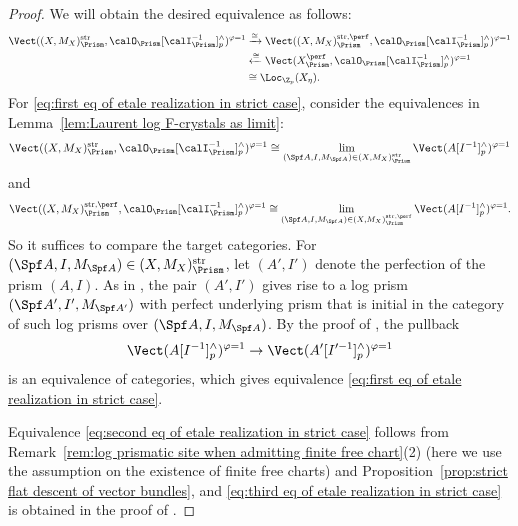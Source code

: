 \begin{proof}
We will obtain the desired equivalence as follows:
\begin{align}
\Vect((X,M_X)_\Prism^\mathrm{str},\calO_\Prism[\calI_\Prism^{-1}]^\wedge_p)^{\varphi=1}
&\xrightarrow{\cong} \Vect((X,M_X)_\Prism^{\mathrm{str},\perf},\calO_\Prism[\calI_\Prism^{-1}]^\wedge_p)^{\varphi=1}
\label{eq:first eq of etale realization in strict case}\\
&\xleftarrow{\cong} \Vect(X_\Prism^\perf,\calO_\Prism[\calI_\Prism^{-1}]^\wedge_p)^{\varphi=1}
\label{eq:second eq of etale realization in strict case}
\\
&\cong \Loc_{\Z_p}(X_\eta).
\label{eq:third eq of etale realization in strict case}
\end{align}
For \eqref{eq:first eq of etale realization in strict case}, consider the equivalences in Lemma~\ref{lem:Laurent log F-crystals as limit}:
\[
\Vect((X,M_X)_\Prism^{\mathrm{str}},\calO_\Prism[\calI_\Prism^{-1}]^\wedge_p)^{\varphi=1}\cong
\lim_{(\Spf A,I,M_{\Spf A})\in (X,M_X)_\Prism^\mathrm{str}}\Vect(A[I^{-1}]^\wedge_p)^{\varphi=1}
\]
and
\[
\Vect((X,M_X)_\Prism^{\mathrm{str},\perf},\calO_\Prism[\calI_\Prism^{-1}]^\wedge_p)^{\varphi=1}\cong
\lim_{(\Spf A,I,M_{\Spf A})\in (X,M_X)_\Prism^{\mathrm{str},\perf}}\Vect(A[I^{-1}]^\wedge_p)^{\varphi=1}.
\]
So it suffices to compare the target categories. For $(\Spf A,I,M_{\Spf A})\in (X,M_X)_\Prism^\mathrm{str}$, let $(A',I')$ denote the perfection of the prism $(A,I)$. As in \cite[Rem.~2.6]{min-wang-HT-crys-log-prism}, the pair $(A',I')$ gives rise to a log prism $(\Spf A',I',M_{\Spf A'})$ with perfect underlying prism that is initial in the category of such log prisms over $(\Spf A,I,M_{\Spf A})$. By the proof of \cite[Cor.~3.7]{bhatt-scholze-prismaticFcrystal},  the pullback
\[
\Vect(A[I^{-1}]^\wedge_p)^{\varphi=1}\rightarrow \Vect(A'[I'^{-1}]^\wedge_p)^{\varphi=1}
\]
is an equivalence of categories, which gives equivalence \eqref{eq:first eq of etale realization in strict case}.

Equivalence \eqref{eq:second eq of etale realization in strict case} follows from Remark~\ref{rem:log prismatic site when admitting finite free chart}(2) (here we use the assumption on the existence of finite free charts) and Proposition~\ref{prop:strict flat descent of vector bundles}, and \eqref{eq:third eq of etale realization in strict case} is obtained in the proof of \cite[Cor.~3.7, 3.8]{bhatt-scholze-prismaticFcrystal}. 
\end{proof}


